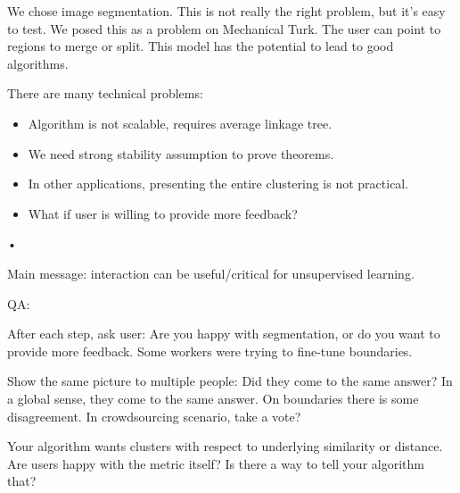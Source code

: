 We chose image segmentation. This is not really the right problem, but it's easy to test. We posed this as a problem on Mechanical Turk. The user can point to regions to merge or split.
This model has the potential to lead to good algorithms.

There are many technical problems:
\begin{itemize}
\item
Algorithm is not scalable, requires average linkage tree.
\item
We need strong stability assumption to prove theorems.
\item
In other applications, presenting the entire clustering is not practical.
\item
What if user is willing to provide more feedback?
\end{itemize}•

Main message: interaction can be useful/critical for unsupervised learning.


QA:

After each step, ask user: Are you happy with segmentation, or do you want to provide more feedback. Some workers were trying to fine-tune boundaries.

Show the same picture to multiple people: %
Did they come to the same answer? In a global sense, they come to the same answer. On boundaries there is some disagreement. In crowdsourcing scenario, take a vote?

Your algorithm wants clusters with respect to underlying similarity or distance. Are users happy with the metric itself? Is there a way to tell your algorithm that?




